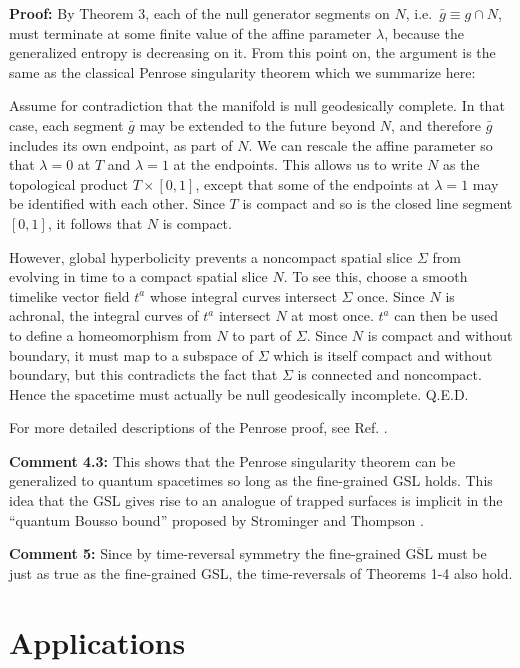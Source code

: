 \documentclass{article}
\begin{document}
\textbf{Proof:} By Theorem 3, each of the null generator segments on $N$, i.e.~$\bar{g} \equiv g \cap N$, must terminate at some finite value of the affine parameter $\lambda$, because the generalized entropy is decreasing on it.  From this point on, the argument is the same as the classical Penrose singularity theorem \cite{HawkingEllis} which we summarize here:

Assume for contradiction that the manifold is null geodesically complete.  In that case, each segment $\bar{g}$ may be extended to the future beyond $N$, and therefore $\bar{g}$ includes its own endpoint, as part of $N$.  We can rescale the affine parameter so that $\lambda = 0$ at $T$ and $\lambda = 1$ at the endpoints.  This allows us to write $N$ as the topological product $T \times [0, 1]$, except that some of the endpoints at $\lambda = 1$ may be identified with each other.  Since $T$ is compact and so is the closed line segment $[0, 1]$, it follows that $N$ is compact.

However, global hyperbolicity prevents a noncompact spatial slice $\Sigma$ from evolving in time to a compact spatial slice $N$.  To see this, choose a smooth timelike vector field $t^a$ whose integral curves intersect $\Sigma$ once.  Since $N$ is achronal, the integral curves of $t^a$ intersect $N$ at most once.  $t^a$ can then be used to define a homeomorphism from $N$ to part of $\Sigma$.  Since $N$ is compact and without boundary, it must map to a subspace of $\Sigma$ which is itself compact and without boundary, but this contradicts the fact that $\Sigma$ is connected and noncompact.  Hence the spacetime must actually be null geodesically incomplete.  Q.E.D.

For more detailed descriptions of the Penrose proof, see Ref. \cite{HawkingEllis}.

\textbf{Comment 4.3:}  This shows that the Penrose singularity theorem can be generalized to quantum spacetimes so long as the fine-grained GSL holds.  This idea that the GSL gives rise to an analogue of trapped surfaces is implicit in the ``quantum Bousso bound'' proposed by Strominger and Thompson \cite{ST}.

\textbf{Comment 5:} Since by time-reversal symmetry the fine-grained $\overline{\mathrm{GSL}}$ must be just as true as the fine-grained GSL, the time-reversals of Theorems 1-4 also hold.

\section{Applications}\label{app}
\end{document}

